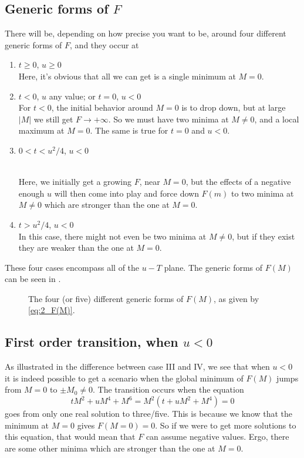\documentclass[11pt,letter, swedish, english
]{article}
\begin{document}
\subsection{Generic forms of $F$}
There will be, depending on how precise you want to be, around four
different generic forms of $F$, and they occur at
\begin{enumerate}[label=\Roman*.]
\item $t\ge0$, $u\ge0$ \\
Here, it's obvious that all we can get is a single minimum at $M=0$.
\item $t<0$, $u$ any value; or $t=0$, $u<0$\\
For $t<0$, the initial behavior around $M=0$ is to drop down, but at
large $|M|$ we still get $F\to+\infty$. So we must have two minima at
$M\neq0$, and a local maximum at $M=0$. The same is true for $t=0$ and
$u<0$. 
\item $0<t<u^2/4$, $u<0$\footnotemark{}\addtocounter{footnote}{-1}\\
Here, we initially get a growing $F$, near $M=0$, but the effects of a
negative enough $u$ will then come into play and force down $F(m)$ to
two minima at $M\neq0$ which are stronger than the one at $M=0$.
\item $t>u^2/4$, $u<0$\footnotemark{}\\
In this case, there might not even be two minima at $M\neq0$, but if
they exist they are weaker than the one at $M=0$.
\end{enumerate}
These four cases encompass all of the $u{-}T$ plane. The generic forms
of $F(M)$ can be seen in .


\begin{figure}
\centering

\caption{The four (or five) different generic forms of $F(M)$, as
  given by \eqref{eq:2_F(M)}. }
\label{fig:2a}
\end{figure}

\subsection{First order transition, when $u<0$}
As illustrated in the difference between case III and IV, we see that
when $u<0$ it is indeed possible to get a scenario when the global
minimum of $F(M)$ jumps from $M=0$ to $\pm M_0\neq0$. The transition
occurs when the equation 
\begin{equation}
tM^2+uM^4+M^6=M^2(t+uM^2+M^4)=0
\end{equation}
goes from only one real solution to three/five. This is because we
know that the minimum at $M=0$ gives $F(M=0)=0$. So if we were to get
more solutions to this equation, that would mean that $F$ can assume
negative values. Ergo, there are some other minima which are stronger
than the one at $M=0$. 
\end{document}
